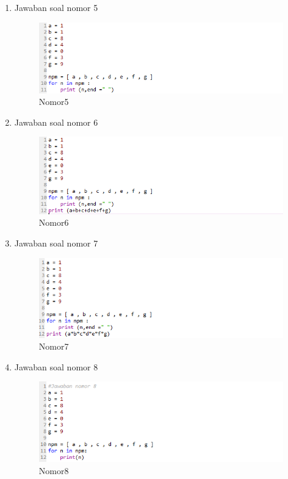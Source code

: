 \begin{enumerate}
    \newpage
     \item Jawaban soal nomor 5
     \begin{figure}[!htbp]
        \centering
        \includegraphics[width=12cm]{figures/jwb5.PNG}
        \caption{Nomor5}
    \end{figure}
    
     \item Jawaban soal nomor 6
     \begin{figure}[!htbp]
        \centering
        \includegraphics[width=12cm]{figures/jwb6.PNG}
        \caption{Nomor6}
    \end{figure}
    
     \item Jawaban soal nomor 7
     \begin{figure}[!htbp]
        \centering
        \includegraphics[width=12cm]{figures/jwb7.PNG}
        \caption{Nomor7}
    \end{figure}

\newpage
     \item Jawaban soal nomor 8
     \begin{figure}[!htbp]
        \centering
        \includegraphics[width=12cm]{figures/jwb8.PNG}
        \caption{Nomor8}
    \end{figure}
    

\end{enumerate}
